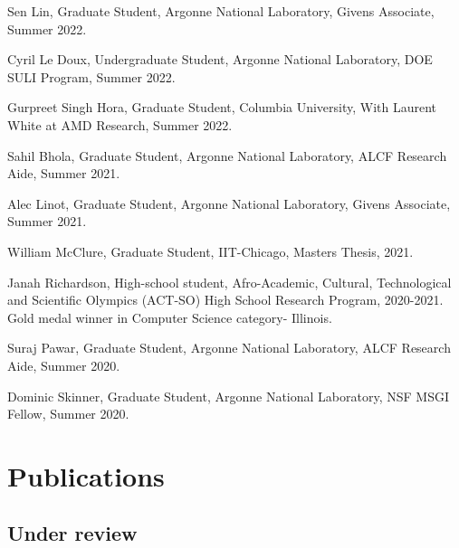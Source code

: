 \documentclass[letterpaper]{article}
\renewenvironment{itemize}{
  \begin{list}{}{
    \setlength{\leftmargin}{1.5em}
  }
}{
  \end{list}
}
\begin{document}
\begin{itemize}
  \item Sen Lin, Graduate Student, Argonne National Laboratory, Givens Associate, Summer 2022.

  \item Cyril Le Doux, Undergraduate Student, Argonne National Laboratory, DOE SULI Program, Summer 2022.

  \item Gurpreet Singh Hora, Graduate Student, Columbia University, With Laurent White at AMD Research, Summer 2022.

  \item Sahil Bhola, Graduate Student, Argonne National Laboratory, ALCF Research Aide, Summer 2021.

  \item Alec Linot, Graduate Student, Argonne National Laboratory, Givens Associate, Summer 2021.

  \item William McClure, Graduate Student, IIT-Chicago, Masters Thesis, 2021. 

  \item Janah Richardson, High-school student, Afro-Academic, Cultural, Technological and Scientific Olympics (ACT-SO) High School Research Program, 2020-2021. Gold medal winner in Computer Science category- Illinois.

  \item Suraj Pawar, Graduate Student, Argonne National Laboratory, ALCF Research Aide, Summer 2020.

  \item Dominic Skinner, Graduate Student, Argonne National Laboratory, NSF MSGI Fellow, Summer 2020.

\end{itemize}


\section*{Publications}

\subsection*{Under review}
\end{document}
